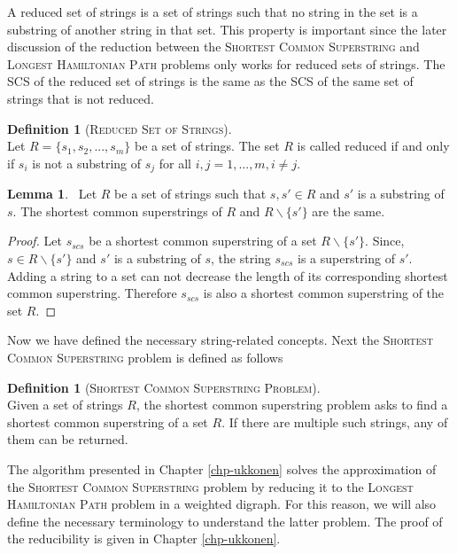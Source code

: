 \documentclass[english,twoside,censored,csm,algorithms-track-2020]{HYthesisML}
\theoremstyle{plain}
\theoremstyle{definition}
\newtheorem{lemma}[theorem]{Lemma}
\newtheorem{definition}[theorem]{Definition}
\begin{document}
A reduced set of strings is a set of strings such that no string in the set is a substring
of another string in that set. This property is important since the later discussion of the
reduction between the \textsc{Shortest Common Superstring} and \textsc{Longest Hamiltonian Path}
problems only works for reduced sets of strings. The SCS of the reduced set of strings
is the same as the SCS of the same set of strings that is not reduced. 

\begin{definition}[\textsc{Reduced Set of Strings}]~\label{def-reduced}\\
  Let $R=\{s_1, s_2,...,s_m\}$ be a set of strings. The set $R$ is called reduced
  if and only if $s_i$ is not a substring of $s_j$ for all $i,j = 1,...,m, i\neq j$.
\end{definition}

\begin{lemma}~\label{lem-reduced}
  Let $R$ be a set of strings such that $s,s'\in R$ and $s'$ is a substring of $s$.
  The shortest common superstrings of $R$ and $R\backslash\{s'\}$ are the same.
\end{lemma}

\begin{proof}
  Let $s_{scs}$ be a shortest common superstring of a set $R\backslash\{s'\}$.
  Since, $s\in R\backslash\{s'\}$ and $s'$ is a substring of $s$, the string
  $s_{scs}$ is a superstring of $s'$. Adding a string to a set can not
  decrease the length of its corresponding shortest common superstring.
  Therefore $s_{scs}$ is also a shortest common superstring of the set
  $R$.
\end{proof}

Now we have defined the necessary string-related concepts. Next the
\textsc{Shortest Common Superstring} problem is defined as follows

\begin{definition}[\textsc{Shortest Common Superstring Problem}]~\label{def-scs-problem}\\
  Given a set of strings $R$, the shortest common superstring problem
  asks to find a shortest common superstring of a set $R$. If there
  are multiple such strings, any of them can be returned.
\end{definition}

The algorithm presented in Chapter \ref{chp-ukkonen} solves the approximation of the
\textsc{Shortest Common Superstring} problem by reducing it to the \textsc{Longest Hamiltonian Path}
problem in a weighted digraph. For this reason, we will also define the necessary terminology
to understand the latter problem. The proof of the reducibility is given in Chapter \ref{chp-ukkonen}.
\end{document}
